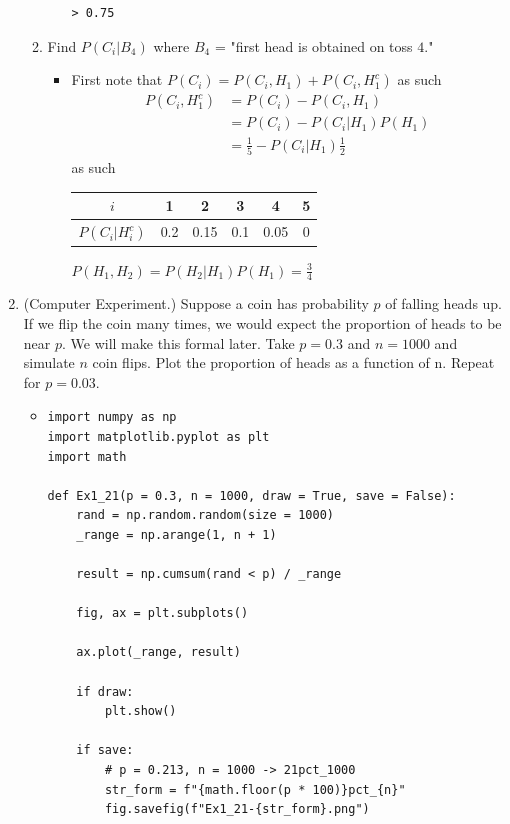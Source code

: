 \documentclass{article}
\begin{document}
\begin{enumerate}
\begin{enumerate}
\begin{itemize}
\begin{verbatim}
> 0.75
\end{verbatim}
			\end{itemize}
		\item Find $P(C_i|B_4)$ where $B_4$ = "first head is obtained on toss $4$."
			\begin{itemize}
				\item First note that $P(C_i) = P(C_i, H_1) + P(C_i, H_1^c)$ as such
				$$
				\begin{aligned}
				P(C_i, H_1^c) &= P(C_i) - P(C_i, H_1) \\
				&= P(C_i) - P(C_i|H_1)P(H_1) \\
				&= \frac{1}{5} - P(C_i|H_1) \frac{1}{2}
				\end{aligned}
				$$
				as such
				\begin{center}
				\begin{tabular}{|c|c|c|c|c|c|}
				\hline
				$i$ & 1 & 2 & 3 & 4 & 5 \\ 
				\hline
				$P(C_i|H_i^c)$ & 0.2 & 0.15 & 0.1 & 0.05 & 0 \\
				\hline
				\end{tabular}
				\end{center}
				$P(H_1, H_2) = P(H_2|H_1)P(H_1) = \frac{3}{4}$
			\end{itemize}
	\end{enumerate}
	\item (Computer Experiment.) Suppose a coin has probability $p$ of falling heads up. If we flip the coin many times, we would expect the proportion of heads to be near $p$. We will make this formal later. Take $p = 0.3$ and $n = 1000$ and simulate $n$ coin flips. Plot the proportion of heads as a function of n. Repeat for $p = 0.03$.
		\begin{itemize}
			\item 
\begin{verbatim}
import numpy as np
import matplotlib.pyplot as plt
import math

def Ex1_21(p = 0.3, n = 1000, draw = True, save = False):
    rand = np.random.random(size = 1000)
    _range = np.arange(1, n + 1)

    result = np.cumsum(rand < p) / _range

    fig, ax = plt.subplots()

    ax.plot(_range, result)

    if draw:
        plt.show()

    if save:
        # p = 0.213, n = 1000 -> 21pct_1000
        str_form = f"{math.floor(p * 100)}pct_{n}"
        fig.savefig(f"Ex1_21-{str_form}.png")


\end{verbatim}
\end{itemize}
\end{enumerate}
\end{document}
